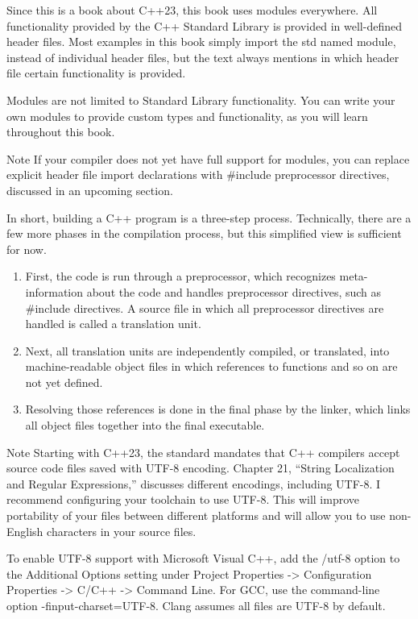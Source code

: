 Since this is a book about C++23, this book uses modules everywhere. All functionality provided by the C++ Standard Library is provided in well-defined header files. Most examples in this book simply import the std named module, instead of individual header files, but the text always mentions in which header file certain functionality is provided.

Modules are not limited to Standard Library functionality. You can write your own modules to provide custom types and functionality, as you will learn throughout this book.

\begin{myNotic}{Note}
If your compiler does not yet have full support for modules, you can replace explicit header file import declarations with \#include preprocessor directives, discussed in an upcoming section.
\end{myNotic}


In short, building a C++ program is a three-step process. Technically, there are a few more phases in the compilation process, but this simplified view is sufficient for now.

\begin{enumerate}
\item
First, the code is run through a preprocessor, which recognizes meta-information about the code and handles preprocessor directives, such as \#include directives. A source file in which all preprocessor directives are handled is called a translation unit.

\item
Next, all translation units are independently compiled, or translated, into machine-readable object files in which references to functions and so on are not yet defined.

\item
Resolving those references is done in the final phase by the linker, which links all object files together into the final executable.
\end{enumerate}


\begin{myNotic}{Note}
Starting with C++23, the standard mandates that C++ compilers accept source code files saved with UTF-8 encoding. Chapter 21, “String Localization and Regular Expressions,” discusses different encodings, including UTF-8. I recommend configuring your toolchain to use UTF-8. This will improve portability of your files between different platforms and will allow you to use non-English characters in your source files.

To enable UTF-8 support with Microsoft Visual C++, add the /utf-8 option to the Additional Options setting under Project Properties -> Configuration Properties -> C/C++ -> Command Line. For GCC, use the command-line option -finput-charset=UTF-8. Clang assumes all files are UTF-8 by default.
\end{myNotic}

